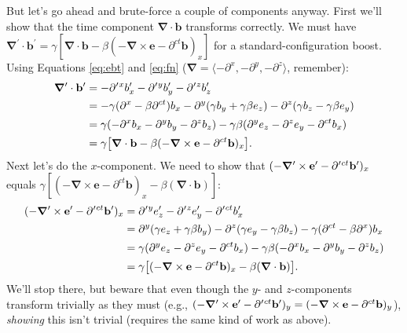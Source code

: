 \documentclass[12pt]{article}
\renewcommand{\vv}[1]{\mathbf{#1}}
\newcommand{\del}{\boldsymbol{\nabla}}
\begin{document}
But let's go ahead and brute-force a couple of components anyway. First we'll show that the time component $\del \cdot \vv b$ transforms correctly. We must have $\del^\prime \cdot \vv b^\prime = \gamma [\del \cdot \vv b - \beta (- \del \times \vv e - \partial^{ct} \vv b )_x]$ for a standard-configuration boost. Using Equations \ref{eq:ebt} and \ref{eq:fn} (${\del = \langle - \partial^x , - \partial^y , - \partial^z \rangle}$, remember):
\begin{equation*}
\begin{aligned}
\del^\prime \cdot \vv b^\prime &= - \partial^{\mkern.5mu \prime \mkern1mu x} b^\prime_x - \partial^{\mkern.5mu \prime \mkern1mu y} b^\prime_y - \partial^{\mkern.5mu \prime \mkern1mu z} b^\prime_z \\
&= - \gamma ( \partial^x - \beta \partial^{ct} ) b_x - \partial^y ( \gamma b_y + \gamma \beta e_z ) - \partial^z (\gamma b_z - \gamma \beta e_y ) \\[1pt]
&= \gamma ( - \partial^x b_x - \partial^y b_y - \partial^z b_z ) - \gamma \beta ( \partial^y e_z - \partial^z e_y - \partial^{ct} b_x ) \\[1pt]
&= \gamma \big[ \del \cdot \vv b - \beta (- \del \times \vv e - \partial^{ct} \vv b )_x \big] .
\end{aligned}
\end{equation*}
Next let's do the $x$-component. We need to show that $(- \del^\prime \times \vv e^\prime - \partial^{\mkern.5mu \prime \mkern1mu ct} \vv b^\prime )_x$ equals $\gamma [(- \del \times \vv e - \partial^{ct} \vv b )_x - \beta (\del \cdot \vv b)]$:
\begin{equation*}
\begin{aligned}
(- \del^\prime \times \vv e^\prime - \partial^{\mkern.5mu \prime \mkern1mu ct} \vv b^\prime )_x &= \partial^{\mkern.5mu \prime \mkern1mu y} e^\prime_z - \partial^{\mkern.5mu \prime \mkern1mu z} e^\prime_y - \partial^{\mkern.5mu \prime \mkern1mu ct} b^\prime_x \\
&= \partial^y (\gamma e_z + \gamma \beta b_y) - \partial^z (\gamma e_y - \gamma \beta b_z) - \gamma(\partial^{ct} - \beta \partial^x) b_x \\[1pt]
&= \gamma (\partial^y e_z - \partial^z e_y - \partial^{ct} b_x) - \gamma \beta ( - \partial^x b_x - \partial^y b_y - \partial^z b_z ) \\[1pt]
&= \gamma \big[ (- \del \times \vv e - \partial^{ct} \vv b )_x - \beta (\del \cdot \vv b) \big] .
\end{aligned}
\end{equation*}
We'll stop there, but beware that even though the $y$- and $z$-components transform trivially as they must (e.g., $(- \del^\prime \times \vv e^\prime - \partial^{\mkern.5mu \prime \mkern1mu ct} \vv b^\prime )_y = (- \del \times \vv e - \partial^{ct} \vv b )_y$), \emph{showing} this isn't trivial (requires the same kind of work as above).
\end{document}
